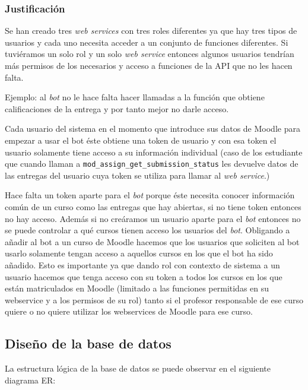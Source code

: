 \subsubsection{Justificación}

Se han creado tres \textit{web services} con tres roles diferentes ya que hay tres tipos de usuarios y cada uno necesita acceder a un conjunto de funciones diferentes. Si tuviéramos un solo rol y un solo \textit{web service} entonces algunos usuarios tendrían más permisos de los necesarios y acceso a funciones de la API que no les hacen falta.
\par
Ejemplo: al \textit{bot} no le hace falta hacer llamadas a la función que obtiene calificaciones de la entrega y por tanto mejor no darle acceso. 
\par
Cada usuario del sistema en el momento que introduce sus datos de Moodle para empezar a usar el bot éste obtiene una token de usuario y con esa token el usuario solamente tiene acceso a su información individual (caso de los estudiante que cuando llaman a \texttt{mod\_assign\_get\_submission\_status} les devuelve datos de las entregas del usuario cuya token se utiliza para llamar al \textit{web service}.)
\par
Hace falta un token aparte para el \textit{bot} porque éste necesita conocer información común de un curso como las entregas que hay abiertas, si no tiene token entonces no hay acceso. Además si no creáramos un usuario aparte para el \textit{bot} entonces no se puede controlar a qué cursos tienen acceso los usuarios del \textit{bot}. Obligando a añadir al bot a un curso de Moodle hacemos que los usuarios que soliciten al bot usarlo solamente tengan acceso a aquellos cursos en los que el bot ha sido añadido. Esto es importante ya que dando rol con contexto de sistema a un usuario hacemos que tenga acceso con su token a todos los cursos en los que están matriculados en Moodle (limitado a las funciones permitidas en su webservice y a los permisos de su rol) tanto si el profesor responsable de ese curso quiere o no quiere utilizar los webservices de Moodle para ese curso.

\newpage
\subsection{Diseño de la base de datos}

La estructura lógica de la base de datos se puede observar en el siguiente diagrama ER:

